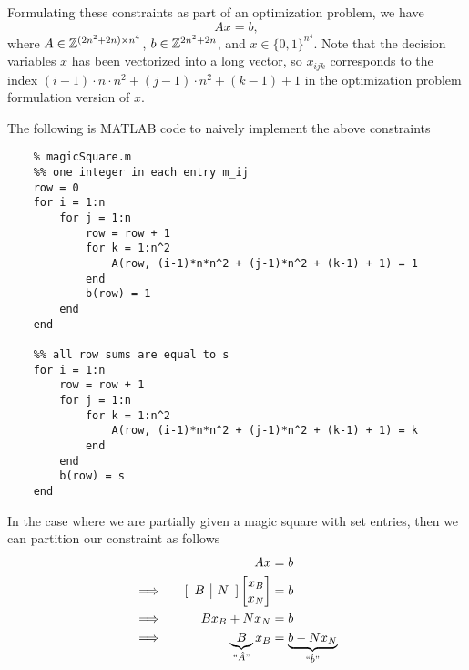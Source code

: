 \noindent Formulating these constraints as part of an optimization problem, we have 
    \[
        Ax = b,
    \]
where $A \in \mathbb Z^{(2n^2+2n) \times n^4}$, $b \in \mathbb Z^{2n^2+2n}$, and $x \in \{0,1\}^{n^4}$. Note that the decision variables $x$ has been vectorized into a long vector, so $x_{ijk}$ corresponds to the index $(i-1) \cdot n \cdot n^2 + (j-1)\cdot n^2 + (k-1) + 1$ in the optimization problem formulation version of $x$.

The following is MATLAB code to naively implement the above constraints
\begin{lstlisting}
    % magicSquare.m
    %% one integer in each entry m_ij
    row = 0
    for i = 1:n
        for j = 1:n
            row = row + 1
            for k = 1:n^2
                A(row, (i-1)*n*n^2 + (j-1)*n^2 + (k-1) + 1) = 1
            end
            b(row) = 1
        end
    end
    
    %% all row sums are equal to s
    for i = 1:n
        row = row + 1
        for j = 1:n
            for k = 1:n^2
                A(row, (i-1)*n*n^2 + (j-1)*n^2 + (k-1) + 1) = k
            end
        end
        b(row) = s
    end
\end{lstlisting}

In the case where we are partially given a magic square with set entries, then we can partition our constraint as follows
\begin{alignat*}{2}
    &&Ax &= b \\
    &\Longrightarrow \quad & [\begin{array}{c|c} B & N\end{array}] \begin{bmatrix}
    x_B \\ x_N \end{bmatrix} &= b \\
    &\Longrightarrow \quad & Bx_B + Nx_N &= b \\
    &\Longrightarrow \quad & \underbrace{B}_{``\hat{A}"}x_B &= \underbrace{b-Nx_N}_{``\hat{b}"}
\end{alignat*}